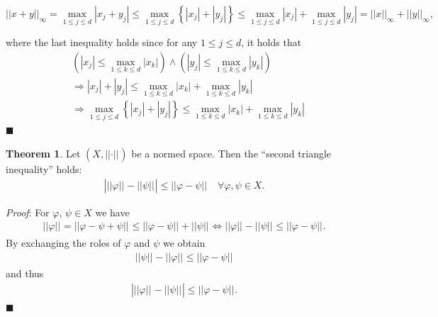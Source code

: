 \documentclass[12pt, a4paper]{article}
\numberwithin{equation}{section}
\theoremstyle{definition}
\theoremstyle{definition}
\newtheorem{theorem}[thm]{Theorem}
\newcommand{\norm}[2]{\left\vert\left\vert #1 \right\vert\right\vert_{#2}}
\newcommand{\abs}[1]{\left\vert #1 \right\vert}
\begin{document}
	$$\norm{x + y}{\infty} = \max_{1\leq j\leq d}{\abs{x_j + y_j}} \leq \max_{1\leq j\leq d}\left\{\abs{x_j} + \abs{y_j}\right\} \leq \max_{1\leq j\leq d}\abs{x_j} + \max_{1\leq j\leq d}\abs{y_j} = \norm{x}{\infty} + \norm{y}{\infty},$$
	
	where the last inequality holds since for any $1\leq j \leq d$, it holds that
	\begin{align*}
		&\left(\abs{x_j} \leq \max_{1\leq k\leq d}\abs{x_k}\right) \wedge \left(\abs{y_j} \leq \max_{1\leq k\leq d}\abs{y_k}\right) 
		\\ &\Rightarrow \abs{x_j} + \abs{y_j} \leq \max_{1\leq k\leq d}\abs{x_k} + \max_{1\leq k\leq d}\abs{y_k} 
		\\ &\Rightarrow \max_{1\leq j\leq d}\left\{\abs{x_j} + \abs{y_j}\right\} \leq \max_{1\leq k\leq d}\abs{x_k} + \max_{1\leq k\leq d}\abs{y_k}
	\end{align*}
	\qquad\qquad\qquad\qquad\qquad\qquad\qquad\qquad\qquad\qquad\qquad\qquad\qquad\qquad\qquad\qquad\qquad\qquad\qquad\qquad\qquad\quad$\blacksquare$
	
	\begin{theorem}\label{second-triangle-inequality}
		Let $(X, \norm{\cdot}{})$ be a normed space. Then the \enquote{second triangle inequality} holds: 
			\begin{align}
				\abs{\norm{\varphi}{} - \norm{\psi}{}} \leq \norm{\varphi - \psi}{} \quad \forall \varphi, \psi \in X. 
			\end{align}
	\end{theorem}
	\noindent\textit{Proof}: For $\varphi$, $\psi \in X$ we have 
	\begin{align}
		\norm{\varphi}{} = \norm{\varphi - \psi + \psi}{} \leq \norm{\varphi - \psi}{} + \norm{\psi}{} \Leftrightarrow \norm{\varphi}{} - \norm{\psi}{} \leq \norm{\varphi - \psi}{}. 
	\end{align}
	By exchanging the roles of $\varphi$ and $\psi$ we obtain 
	\begin{align}
		\norm{\psi}{} - \norm{\varphi}{} \leq \norm{\varphi - \psi}{}
	\end{align}
	and thus 
	\begin{align}
		\abs{\norm{\varphi}{} - \norm{\psi}{}} \leq \norm{\varphi - \psi}{}. 
	\end{align}
	\qquad\qquad\qquad\qquad\qquad\qquad\qquad\qquad\qquad\qquad\qquad\qquad\qquad\qquad\qquad\qquad\qquad\qquad\qquad\qquad\qquad\quad$\blacksquare$
	
\end{document}

